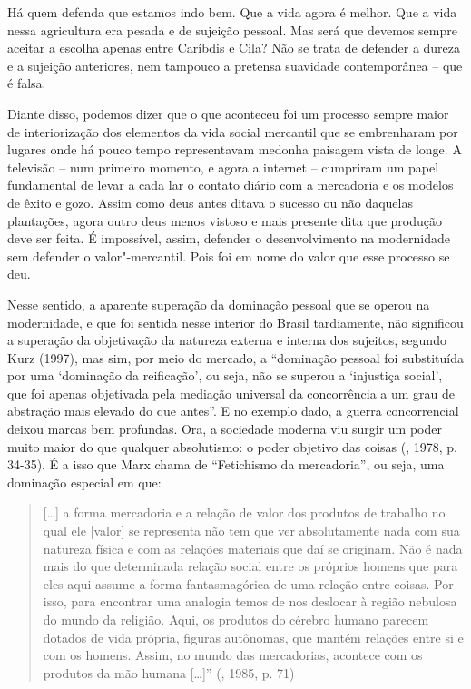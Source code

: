 Há quem defenda que estamos indo bem. Que a vida agora é melhor. Que a
vida nessa agricultura era pesada e de sujeição pessoal. Mas será que
devemos sempre aceitar a escolha apenas entre Caríbdis e Cila? Não se
trata de defender a dureza e a sujeição anteriores, nem tampouco a
pretensa suavidade contemporânea -- que é falsa.

Diante disso, podemos dizer que o que aconteceu foi um processo sempre
maior de interiorização dos elementos da vida social mercantil que se
embrenharam por lugares onde há pouco tempo representavam medonha paisagem vista de longe. A
televisão -- num primeiro momento, e agora a internet -- cumpriram um
papel fundamental de levar a cada lar o contato diário com a mercadoria
e os modelos de êxito e gozo. Assim como deus antes ditava o sucesso ou
não daquelas plantações, agora outro deus menos vistoso e mais presente
dita que produção deve ser feita. É impossível, assim, defender o
desenvolvimento na modernidade sem defender o valor"-mercantil. Pois foi
em nome do valor que esse processo se deu.

Nesse sentido, a aparente superação da dominação pessoal que se operou
na modernidade, e que foi sentida nesse interior do Brasil tardiamente,
não significou a superação da objetivação da natureza externa e interna
dos sujeitos, segundo Kurz (1997), mas sim, por meio do mercado, a
``dominação pessoal foi substituída por uma `dominação da reificação',
ou seja, não se superou a `injustiça social', que foi apenas objetivada
pela mediação universal da concorrência a um grau de abstração mais
elevado do que antes''. E no exemplo dado, a guerra concorrencial deixou
marcas bem profundas. Ora, a sociedade moderna viu surgir um poder muito
maior do que qualquer absolutismo: o poder objetivo das coisas (,
1978, p. 34-35). É a isso que Marx chama de ``Fetichismo da
mercadoria'', ou seja, uma dominação especial em que:

\begin{quote}
[\ldots{}] a forma mercadoria e a relação de valor dos produtos de
trabalho no qual ele [valor] se representa não tem que ver
absolutamente nada com sua natureza física e com as relações materiais
que daí se originam. Não é nada mais do que determinada relação social
entre os próprios homens que para eles aqui assume a forma
fantasmagórica de uma relação entre coisas. Por isso, para encontrar uma
analogia temos de nos deslocar à região nebulosa do mundo da religião.
Aqui, os produtos do cérebro humano parecem dotados de vida própria,
figuras autônomas, que mantém relações entre si e com os homens. Assim,
no mundo das mercadorias, acontece com os produtos da mão humana
[\ldots{}]'' (, 1985, p. 71)
\end{quote}

